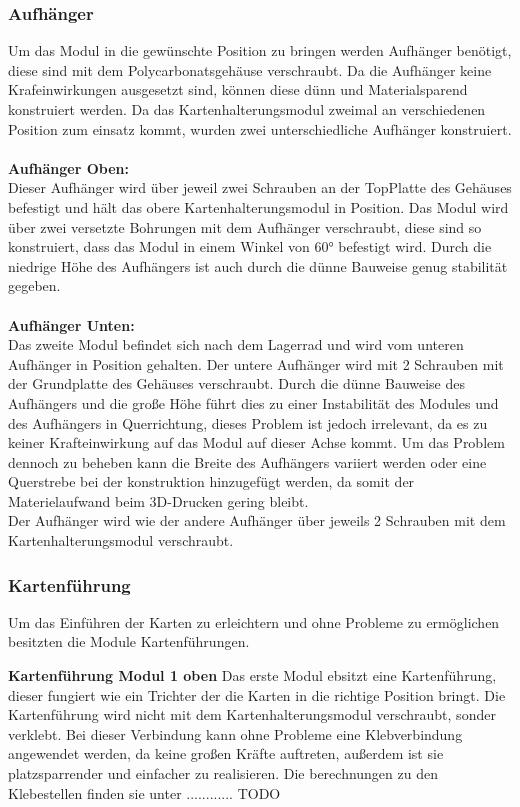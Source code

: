 \subsubsection{Aufhänger}
Um das Modul in die gewünschte Position zu bringen werden Aufhänger benötigt, diese sind mit dem Polycarbonatsgehäuse verschraubt.
Da die Aufhänger keine Krafeinwirkungen ausgesetzt sind, können diese dünn und Materialsparend konstruiert werden.
Da das Kartenhalterungsmodul zweimal an verschiedenen Position zum einsatz kommt, wurden zwei unterschiedliche
Aufhänger konstruiert.\\\\
\textbf{Aufhänger Oben:} \\
Dieser Aufhänger wird über jeweil zwei Schrauben an der TopPlatte des Gehäuses befestigt und hält das obere Kartenhalterungsmodul in Position.
Das Modul wird über zwei versetzte Bohrungen mit dem Aufhänger verschraubt, diese sind so konstruiert, dass das Modul in einem
Winkel von 60° befestigt wird.
Durch die niedrige Höhe des Aufhängers ist auch durch die dünne Bauweise genug stabilität gegeben.\\\\
\textbf{Aufhänger Unten:}\\
Das zweite Modul befindet sich nach dem Lagerrad und wird vom unteren Aufhänger in Position gehalten. Der untere Aufhänger
wird mit 2 Schrauben mit der Grundplatte des Gehäuses verschraubt. Durch die dünne Bauweise des Aufhängers und die
große Höhe führt dies zu einer Instabilität des Modules und des Aufhängers in Querrichtung, dieses Problem ist jedoch irrelevant, da es
zu keiner Krafteinwirkung auf das Modul auf dieser Achse kommt. Um das Problem dennoch zu beheben kann die Breite des
Aufhängers variiert werden oder eine Querstrebe bei der konstruktion hinzugefügt werden, da somit der Materielaufwand beim 3D-Drucken gering bleibt.\\
Der Aufhänger wird wie der andere Aufhänger über jeweils 2 Schrauben mit dem Kartenhalterungsmodul verschraubt.

\subsubsection{Kartenführung}
Um das Einführen der Karten zu erleichtern und ohne Probleme zu ermöglichen besitzten die Module Kartenführungen.

\textbf{Kartenführung Modul 1 oben}
Das erste Modul ebsitzt eine Kartenführung, dieser fungiert wie ein Trichter der die Karten in die richtige Position bringt.
Die Kartenführung wird nicht mit dem Kartenhalterungsmodul verschraubt, sonder
verklebt. Bei dieser Verbindung kann ohne Probleme eine Klebverbindung angewendet werden, da keine großen Kräfte auftreten, außerdem
ist sie platzsparrender und einfacher zu realisieren. Die berechnungen zu den Klebestellen finden sie unter ............ TODO

